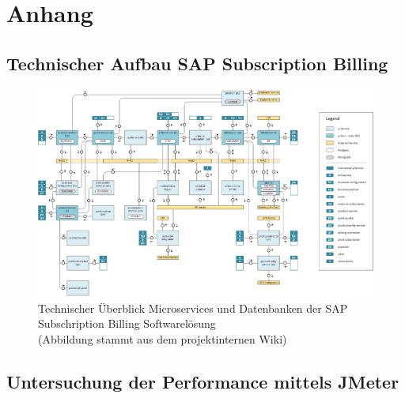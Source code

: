 \chapter{Anhang}
\section{Technischer Aufbau SAP Subscription Billing}
\label{anhang_cf_infrastruktur}
\begin{figure}[h]
	\begin{center}
		\includegraphics[width=16cm]{img/ssb_microservices.JPG}
		\caption[Technischer Überblick Microservices und Datenbanken der SAP Subschription Billing Softwarelösung]{Technischer Überblick Microservices und Datenbanken der SAP Subschription Billing Softwarelösung\\ (Abbildung stammt aus dem projektinternen Wiki)}
		\label{grafik_ssb_microservices}
	\end{center}
\end{figure}

\newpage
\section{Untersuchung der Performance mittels JMeter}
